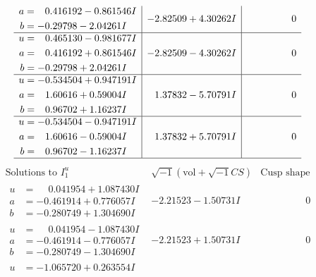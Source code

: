 \documentclass[1p]{elsarticle_modified}
\theoremstyle{definition}
\newcommand{\I}{\sqrt{-1}}
\begin{document}
$$\begin{array}{c|c|c}
\begin{aligned}
a &= \phantom{-}0.416192 - 0.861546 I \\
b &= -0.29798 - 2.04261 I\end{aligned}
 & -2.82509 + 4.30262 I & \phantom{-0.000000 } 0 \\ \hline\begin{aligned}
u &= \phantom{-}0.465130 - 0.981677 I \\
a &= \phantom{-}0.416192 + 0.861546 I \\
b &= -0.29798 + 2.04261 I\end{aligned}
 & -2.82509 - 4.30262 I & \phantom{-0.000000 } 0 \\ \hline\begin{aligned}
u &= -0.534504 + 0.947191 I \\
a &= \phantom{-}1.60616 + 0.59004 I \\
b &= \phantom{-}0.96702 + 1.16237 I\end{aligned}
 & \phantom{-}1.37832 - 5.70791 I & \phantom{-0.000000 } 0 \\ \hline\begin{aligned}
u &= -0.534504 - 0.947191 I \\
a &= \phantom{-}1.60616 - 0.59004 I \\
b &= \phantom{-}0.96702 - 1.16237 I\end{aligned}
 & \phantom{-}1.37832 + 5.70791 I & \phantom{-0.000000 } 0\\
 \hline 
 \end{array}$$\newpage$$\begin{array}{c|c|c}  
\text{Solutions to }I^u_{1}& \I (\text{vol} + \sqrt{-1}CS) & \text{Cusp shape}\\
 \hline 
\begin{aligned}
u &= \phantom{-}0.041954 + 1.087430 I \\
a &= -0.461914 + 0.776057 I \\
b &= -0.280749 + 1.304690 I\end{aligned}
 & -2.21523 - 1.50731 I & \phantom{-0.000000 } 0 \\ \hline\begin{aligned}
u &= \phantom{-}0.041954 - 1.087430 I \\
a &= -0.461914 - 0.776057 I \\
b &= -0.280749 - 1.304690 I\end{aligned}
 & -2.21523 + 1.50731 I & \phantom{-0.000000 } 0 \\ \hline\begin{aligned}
u &= -1.065720 + 0.263554 I \\

\end{aligned}
\end{array}$$
\end{document}
